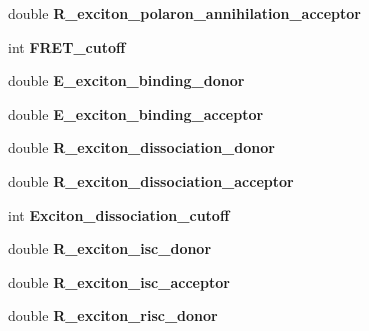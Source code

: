 \begin{DoxyCompactItemize}
\mbox{\label{struct_parameters___o_p_v_a8ce8b281ba79d02867f60e22142cf7c8}} 
double {\bfseries R\+\_\+exciton\+\_\+polaron\+\_\+annihilation\+\_\+acceptor}
\item 
\mbox{\label{struct_parameters___o_p_v_a5fc92d26c86f41eb905da56629d483ef}} 
int {\bfseries F\+R\+E\+T\+\_\+cutoff}
\item 
\mbox{\label{struct_parameters___o_p_v_ad23850399d27e4d8c6c3c803243e2712}} 
double {\bfseries E\+\_\+exciton\+\_\+binding\+\_\+donor}
\item 
\mbox{\label{struct_parameters___o_p_v_a28998663eb890458a662eefc8f9ea0c9}} 
double {\bfseries E\+\_\+exciton\+\_\+binding\+\_\+acceptor}
\item 
\mbox{\label{struct_parameters___o_p_v_ad021801a526f21ae43037f3e573d50e7}} 
double {\bfseries R\+\_\+exciton\+\_\+dissociation\+\_\+donor}
\item 
\mbox{\label{struct_parameters___o_p_v_aa52d0a4c9795976b4516e214104dd815}} 
double {\bfseries R\+\_\+exciton\+\_\+dissociation\+\_\+acceptor}
\item 
\mbox{\label{struct_parameters___o_p_v_ad4aaf3f56fe842bc998b3608c5b5b40b}} 
int {\bfseries Exciton\+\_\+dissociation\+\_\+cutoff}
\item 
\mbox{\label{struct_parameters___o_p_v_a424ec76e06337bddcdd68550e448792f}} 
double {\bfseries R\+\_\+exciton\+\_\+isc\+\_\+donor}
\item 
\mbox{\label{struct_parameters___o_p_v_a9ebd4980c4aa28e62f725e39f93fbc3b}} 
double {\bfseries R\+\_\+exciton\+\_\+isc\+\_\+acceptor}
\item 
\mbox{\label{struct_parameters___o_p_v_ace6d9ab02c79ca3483988089e4c1b9a3}} 
double {\bfseries R\+\_\+exciton\+\_\+risc\+\_\+donor}
\item 
\mbox{\label{struct_parameters___o_p_v_ad6198eb075e56b1e69880d8323d7bf65}} 

\end{DoxyCompactItemize}
